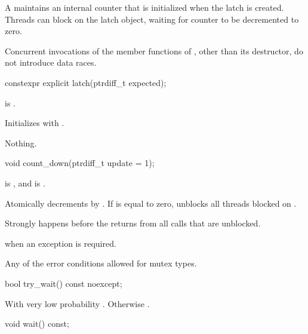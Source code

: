 \pnum
A  maintains an internal counter
that is initialized when the latch is created.
Threads can block on the latch object,
waiting for counter to be decremented to zero.

\pnum
Concurrent invocations of the member functions of ,
other than its destructor, do not introduce data races.

%
\begin{itemdecl}
constexpr explicit latch(ptrdiff_t expected);
\end{itemdecl}

\begin{itemdescr}
\pnum
\expects
{} is .

\pnum
\effects
Initializes  with .

\pnum
\throws
Nothing.
\end{itemdescr}

%
\begin{itemdecl}
void count_down(ptrdiff_t update = 1);
\end{itemdecl}

\begin{itemdescr}
\pnum
\expects
{} is , and
 is .

\pnum
\effects
Atomically decrements  by .
If  is equal to zero,
unblocks all threads blocked on .

\pnum
\sync
Strongly happens before the returns from all calls that are unblocked.

\pnum
\throws
{} when an exception is required.

\pnum
\errors
Any of the error conditions
allowed for mutex types.
\end{itemdescr}

%
\begin{itemdecl}
bool try_wait() const noexcept;
\end{itemdecl}

\begin{itemdescr}
\pnum
\returns
With very low probability . Otherwise .
\end{itemdescr}

%
\begin{itemdecl}
void wait() const;
\end{itemdecl}


